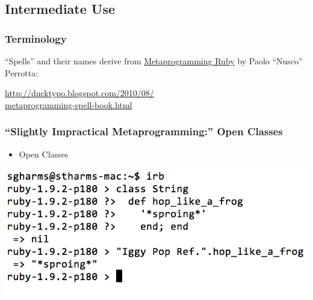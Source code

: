 \documentclass[slidestop,compress,mathserif]{beamer}
\begin{document}
\subsection{Intermediate Use} %
\label{sub:intermediate_use}

\begin{frame}
	\frametitle{Terminology}
	``Spells'' and their names derive from \underline{Metaprogramming Ruby} by Paolo ``Nusco'' Perrotta:
	\vskip 0.5cm
	\begin{center}
		\underline{http://ducktypo.blogspot.com/2010/08/} \\
		\underline{metaprogramming-spell-book.html}
	\end{center}
\end{frame}

\begin{frame}
	\frametitle{``Slightly Impractical Metaprogramming:''  Open Classes}
	\begin{itemize}
		\item Open Classes
	\end{itemize}
		\includegraphics[scale=0.42]{img/open_class.png}	
\end{frame}
\end{document}
